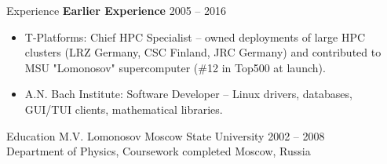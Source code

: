 \documentclass{resume} %
\begin{document}
\begin{rSection}{Experience}
\textbf{Earlier Experience} \hfill 2005 -- 2016
\begin{itemize}
  \item T-Platforms: Chief HPC Specialist -- owned deployments of large HPC clusters (LRZ Germany, CSC Finland, JRC Germany) and contributed to MSU "Lomonosov" supercomputer (\#12 in Top500 at launch).
  \item A.N. Bach Institute: Software Developer -- Linux drivers, databases, GUI/TUI clients, mathematical libraries.
\end{itemize}

\end{rSection}

\begin{rSection}{Education}
M.V. Lomonosov Moscow State University \hfill 2002 -- 2008 \\
Department of Physics, Coursework completed \hfill Moscow, Russia
\end{rSection}
\end{document}

